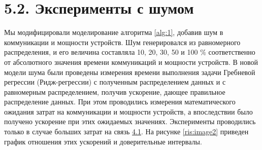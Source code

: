 \documentclass{article}
\theoremstyle{definition}
\theoremstyle{plain}
\begin{document}



\section*{5.2. Эксперименты с шумом}

Мы модифицировали моделирование алгоритма \ref{alg:1}, добавив шум в коммуникации и мощности устройств. Шум генерировался из равномерного распределения, и его величина составляла 10, 20, 30, 50 и 100 $\%$ соответственно от абсолютного значения времени коммуникаций и мощности устройств. В новой модели шума были проведены измерения времени выполнения задачи Гребневой регрессии (Ридж-регрессии) с полученным распределением данных и с равномерным распределением, получив ускорение, дающее правильное распределение данных. При этом проводились измерения математического ожидания затрат на коммуникации и мощности устройств, а впоследствии было  получено ускорение при этих ожидаемых значениях. Эксперименты проводились только в случае больших затрат на связь \hyperref[s:4.1]{4.1}. На рисунке \ref{ris:image2} приведен график отношения этих ускорений и доверительные интервалы.
\end{document}
